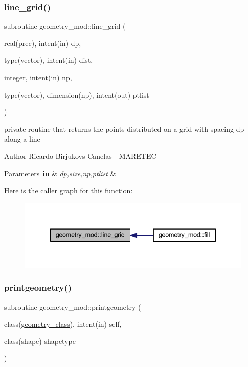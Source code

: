 \subsubsection{\texorpdfstring{line\+\_\+grid()}{line\_grid()}}
{\footnotesize\ttfamily subroutine geometry\+\_\+mod\+::line\+\_\+grid (\begin{DoxyParamCaption}\item[{real(prec), intent(in)}]{dp,  }\item[{type(vector), intent(in)}]{dist,  }\item[{integer, intent(in)}]{np,  }\item[{type(vector), dimension(np), intent(out)}]{ptlist }\end{DoxyParamCaption})\hspace{0.3cm}{\ttfamily [private]}}



private routine that returns the points distributed on a grid with spacing dp along a line 

\begin{DoxyAuthor}{Author}
Ricardo Birjukovs Canelas -\/ M\+A\+R\+E\+T\+EC 
\end{DoxyAuthor}

\begin{DoxyParams}[1]{Parameters}
\mbox{\tt in}  & {\em dp,size,np,ptlist} & \\
\hline
\end{DoxyParams}
Here is the caller graph for this function\+:\nopagebreak
\begin{figure}[H]
\begin{center}
\leavevmode
\includegraphics[width=335pt]{namespacegeometry__mod_abcb09c0f5274c27cb79b0dd009ed94b3_icgraph}
\end{center}
\end{figure}
\mbox{\label{namespacegeometry__mod_aed4426181ca851b41717edd50268e5f3}} 
\subsubsection{\texorpdfstring{printgeometry()}{printgeometry()}}
{\footnotesize\ttfamily subroutine geometry\+\_\+mod\+::printgeometry (\begin{DoxyParamCaption}\item[{class(\hyperlink{structgeometry__mod_1_1geometry__class}{geometry\+\_\+class}), intent(in)}]{self,  }\item[{class(\hyperlink{structgeometry__mod_1_1shape}{shape})}]{shapetype }\end{DoxyParamCaption})\hspace{0.3cm}{\ttfamily [private]}}



